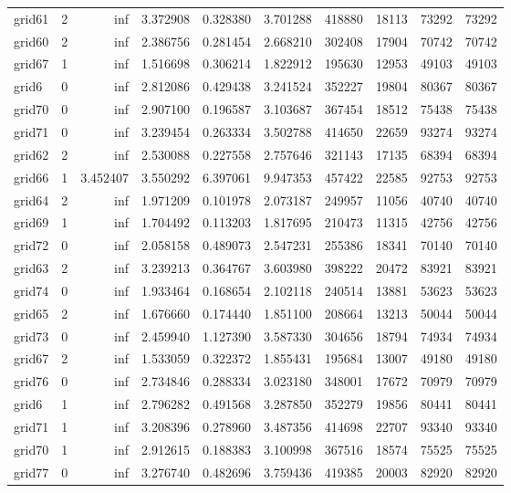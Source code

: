\documentclass[../../../thesis.tex]{subfiles}
\begin{document}
\begin{longtable}{|l|r|r|r|r|r|r|r|r|r|}
grid61 & 2 & inf & 3.372908 & 0.328380 & 3.701288 & 418880 & 18113 & 73292 & 73292 \\
grid60 & 2 & inf & 2.386756 & 0.281454 & 2.668210 & 302408 & 17904 & 70742 & 70742 \\
grid67 & 1 & inf & 1.516698 & 0.306214 & 1.822912 & 195630 & 12953 & 49103 & 49103 \\
grid6 & 0 & inf & 2.812086 & 0.429438 & 3.241524 & 352227 & 19804 & 80367 & 80367 \\
grid70 & 0 & inf & 2.907100 & 0.196587 & 3.103687 & 367454 & 18512 & 75438 & 75438 \\
grid71 & 0 & inf & 3.239454 & 0.263334 & 3.502788 & 414650 & 22659 & 93274 & 93274 \\
grid62 & 2 & inf & 2.530088 & 0.227558 & 2.757646 & 321143 & 17135 & 68394 & 68394 \\
grid66 & 1 & 3.452407 & 3.550292 & 6.397061 & 9.947353 & 457422 & 22585 & 92753 & 92753 \\
grid64 & 2 & inf & 1.971209 & 0.101978 & 2.073187 & 249957 & 11056 & 40740 & 40740 \\
grid69 & 1 & inf & 1.704492 & 0.113203 & 1.817695 & 210473 & 11315 & 42756 & 42756 \\
grid72 & 0 & inf & 2.058158 & 0.489073 & 2.547231 & 255386 & 18341 & 70140 & 70140 \\
grid63 & 2 & inf & 3.239213 & 0.364767 & 3.603980 & 398222 & 20472 & 83921 & 83921 \\
grid74 & 0 & inf & 1.933464 & 0.168654 & 2.102118 & 240514 & 13881 & 53623 & 53623 \\
grid65 & 2 & inf & 1.676660 & 0.174440 & 1.851100 & 208664 & 13213 & 50044 & 50044 \\
grid73 & 0 & inf & 2.459940 & 1.127390 & 3.587330 & 304656 & 18794 & 74934 & 74934 \\
grid67 & 2 & inf & 1.533059 & 0.322372 & 1.855431 & 195684 & 13007 & 49180 & 49180 \\
grid76 & 0 & inf & 2.734846 & 0.288334 & 3.023180 & 348001 & 17672 & 70979 & 70979 \\
grid6 & 1 & inf & 2.796282 & 0.491568 & 3.287850 & 352279 & 19856 & 80441 & 80441 \\
grid71 & 1 & inf & 3.208396 & 0.278960 & 3.487356 & 414698 & 22707 & 93340 & 93340 \\
grid70 & 1 & inf & 2.912615 & 0.188383 & 3.100998 & 367516 & 18574 & 75525 & 75525 \\
grid77 & 0 & inf & 3.276740 & 0.482696 & 3.759436 & 419385 & 20003 & 82920 & 82920 \\

\end{longtable}
\end{document}
